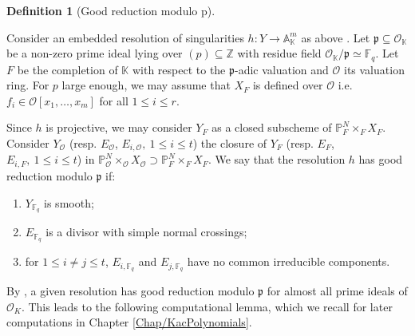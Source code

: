 \documentclass[11pt,english]{article}
\numberwithin{equation}{section}
\numberwithin{figure}{section}
\theoremstyle{definition}
\newtheorem{df}{Definition}[subsection]
\theoremstyle{plain}
\theoremstyle{remark}
\newcommand\ZZ{\mathbb{Z}}
\newcommand\FF{\mathbb{F}}
\newcommand\KK{\mathbb{K}}
\begin{document}
\begin{df}[Good reduction modulo p] \label{Def/GoodRed}

Consider an embedded resolution of singularities $h:Y\rightarrow\mathbb{A}_{\KK}^{m}$
as above . Let $\mathfrak{p}\subseteq\mathcal{O}_{\KK}$ be a non-zero
prime ideal lying over $(p)\subseteq\ZZ$ with residue field $\mathcal{O}_{\KK}/\mathfrak{p}\simeq\FF_{q}$.
Let $F$ be the completion of $\KK$ with respect to the $\mathfrak{p}$-adic
valuation and $\mathcal{O}$ its valuation ring. For $p$ large enough,
we may assume that $X_{F}$ is defined over $\mathcal{O}$ i.e. $f_{i}\in\mathcal{O}[x_{1},\ldots,x_{m}]$
for all $1\leq i\leq r$.

Since $h$ is projective, we may consider $Y_{F}$ as a closed subscheme
of $\mathbb{P}_{F}^{N}\times_{F}X_{F}$. Consider $Y_{\mathcal{O}}$
(resp. $E_{\mathcal{O}}$, $E_{i,\mathcal{O}},\ 1\leq i\leq t$) the
closure of $Y_{F}$ (resp. $E_{F}$, $E_{i,F},\ 1\leq i\leq t$) in
$\mathbb{P}_{\mathcal{O}}^{N}\times_{\mathcal{O}}X_{\mathcal{O}}\supset\mathbb{P}_{F}^{N}\times_{F}X_{F}$.
We say that the resolution $h$ has good reduction modulo $\mathfrak{p}$
if:
\begin{enumerate}
\item $Y_{\FF_{q}}$ is smooth;
\item $E_{\mathbb{F}_{q}}$ is a divisor with simple normal crossings;
\item for $1\leq i\ne j\leq t$, $E_{i,\mathbb{F}_{q}}$ and $E_{j,\mathbb{F}_{q}}$
have no common irreducible components.
\end{enumerate}
\end{df}

By \cite[Thm. 2.4.]{Den87}, a given resolution has good reduction
modulo $\mathfrak{p}$ for almost all prime ideals of $\mathcal{O}_{K}$.
This leads to the following computational lemma, which we recall for
later computations in Chapter \ref{Chap/KacPolynomials}.
\end{document}
